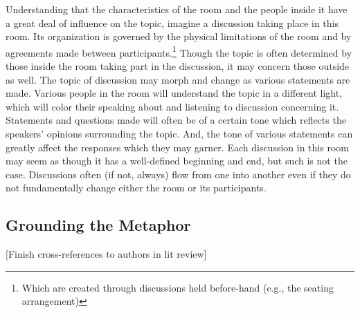 \documentclass{article}
\begin{document}
Understanding that the characteristics of the room and the people inside it have a great deal of influence on the topic, imagine a discussion taking place in this room.
Its organization is governed by the physical limitations of the room and by agreements made between participants.\footnote{Which are created through discussions held before-hand (e.g., the seating arrangement)}
Though the topic is often determined by those inside the room taking part in the discussion, it may concern those outside as well.
The topic of discussion may morph and change as various statements are made.
Various people in the room will understand the topic in a different light, which will color their speaking about and listening to discussion concerning it.
Statements and questions made will often be of a certain tone which reflects the speakers' opinions surrounding the topic.
And, the tone of various statements can greatly affect the responses which they may garner.
Each discussion in this room may seem as though it has a well-defined beginning and end, but such is not the case.
Discussions often (if not, always) flow from one into another even if they do not fundamentally change either the room or its participants.

\subsection{Grounding the Metaphor}
[Finish cross-references to authors in lit review]
\end{document}
